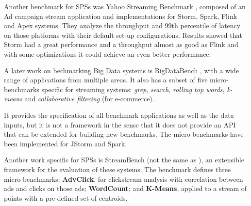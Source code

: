 \documentclass[ppgc,diss,english]{iiufrgs}
\begin{document}
Another benchmark for SPSs was Yahoo Streaming Benchmark \cite{yahoo2015bench}, composed of an Ad campaign stream application and implementations for Storm, Spark, Flink and Apex systems. They analyze the throughput and 99th percentile of latency on those platforms with their default set-up configurations. Results showed that Storm had a great performance and a throughput almost as good as Flink and with some optimizations it could achieve an even better performance.


A later work on bechmarking Big Data systems is BigDataBench \cite{wang2014bigdatabench}, with a wide range of applications from multiple areas. It also has a subset of five micro-benchmarks specific for streaming systems: \textit{grep}, \textit{search}, \textit{rolling top words}, \textit{k-means} and \textit{collaborative filtering} (for e-commerce).

It provides the specification of all benchmark applications as well as the data inputs, but it is not a framework in the sense that it does not provide an API that can be extended for building new benchmarks. The micro-benchmarks have been implemented for JStorm and Spark.




Another work specific for SPSs is StreamBench \cite{wang2016stream} (not the same as \cite{lu2014stream}), an extensible framework for the evaluation of these systems. The benchmark defines three micro-benchmarks: \textbf{AdvClick}, for clickstream analysis with correlation between ads and clicks on those ads; \textbf{WordCount}; and \textbf{K-Means}, applied to a stream of points with a pre-defined set of centroids.
\end{document}
